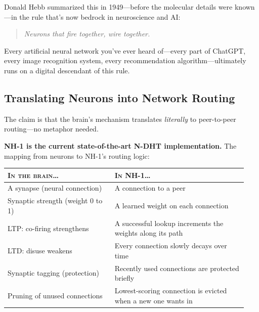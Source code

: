 \documentclass[nobib]{tufte-handout}
\begin{document}
Donald Hebb summarized this in 1949---before the molecular details were known---in the rule that's now bedrock in neuroscience and AI:

\begin{quote}\itshape
Neurons that fire together, wire together.
\end{quote}

Every artificial neural network you've ever heard of---every part of ChatGPT, every image recognition system, every recommendation algorithm---ultimately runs on a digital descendant of this rule.

\subsection{Translating Neurons into Network Routing}

The claim is that the brain's mechanism translates \emph{literally} to peer-to-peer routing---no metaphor needed.

\textbf{NH-1 is the current state-of-the-art N-DHT implementation.} The mapping from neurons to NH-1's routing logic:

\begin{table}[h]
\small
\begin{tabular}{@{}p{0.42\linewidth}p{0.52\linewidth}@{}}
\toprule
\textsc{In the brain\dots} & \textsc{In NH-1\dots} \\
\midrule
A synapse (neural connection) & A connection to a peer \\
Synaptic strength (weight 0 to 1) & A learned weight on each connection \\
LTP: co-firing strengthens & A successful lookup increments the weights along its path \\
LTD: disuse weakens & Every connection slowly decays over time \\
Synaptic tagging (protection) & Recently used connections are protected briefly \\
Pruning of unused connections & Lowest-scoring connection is evicted when a new one wants in \\
\bottomrule
\end{tabular}
\end{table}
\end{document}
